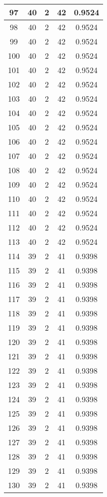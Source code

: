 \documentclass[letterpaper, 12pt]{article}
\begin{document}
\begin{longtable}{|c|c|c|c|c|}
\hline
97 & 40 & 2 & 42 & 0.9524 \\
\hline
98 & 40 & 2 & 42 & 0.9524 \\
\hline
99 & 40 & 2 & 42 & 0.9524 \\
\hline
100 & 40 & 2 & 42 & 0.9524 \\
\hline
101 & 40 & 2 & 42 & 0.9524 \\
\hline
102 & 40 & 2 & 42 & 0.9524 \\
\hline
103 & 40 & 2 & 42 & 0.9524 \\
\hline
104 & 40 & 2 & 42 & 0.9524 \\
\hline
105 & 40 & 2 & 42 & 0.9524 \\
\hline
106 & 40 & 2 & 42 & 0.9524 \\
\hline
107 & 40 & 2 & 42 & 0.9524 \\
\hline
108 & 40 & 2 & 42 & 0.9524 \\
\hline
109 & 40 & 2 & 42 & 0.9524 \\
\hline
110 & 40 & 2 & 42 & 0.9524 \\
\hline
111 & 40 & 2 & 42 & 0.9524 \\
\hline
112 & 40 & 2 & 42 & 0.9524 \\
\hline
113 & 40 & 2 & 42 & 0.9524 \\
\hline
114 & 39 & 2 & 41 & 0.9398 \\
\hline
115 & 39 & 2 & 41 & 0.9398 \\
\hline
116 & 39 & 2 & 41 & 0.9398 \\
\hline
117 & 39 & 2 & 41 & 0.9398 \\
\hline
118 & 39 & 2 & 41 & 0.9398 \\
\hline
119 & 39 & 2 & 41 & 0.9398 \\
\hline
120 & 39 & 2 & 41 & 0.9398 \\
\hline
121 & 39 & 2 & 41 & 0.9398 \\
\hline
122 & 39 & 2 & 41 & 0.9398 \\
\hline
123 & 39 & 2 & 41 & 0.9398 \\
\hline
124 & 39 & 2 & 41 & 0.9398 \\
\hline
125 & 39 & 2 & 41 & 0.9398 \\
\hline
126 & 39 & 2 & 41 & 0.9398 \\
\hline
127 & 39 & 2 & 41 & 0.9398 \\
\hline
128 & 39 & 2 & 41 & 0.9398 \\
\hline
129 & 39 & 2 & 41 & 0.9398 \\
\hline
130 & 39 & 2 & 41 & 0.9398 \\

\end{longtable}
\end{document}
